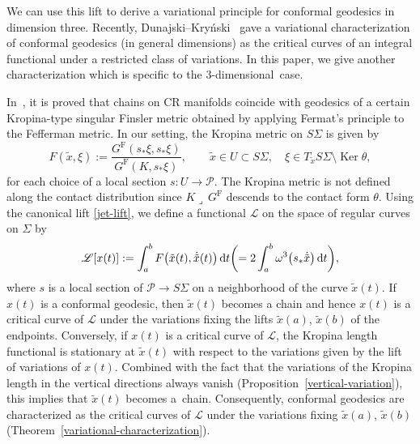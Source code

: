 \documentclass[pdftex]{sigma}
\renewcommand\th{\theta}
\numberwithin{equation}{section}
\begin{document}
We can use this lift to derive a variational principle for conformal geodesics in dimension three. Recently, Dunajski--Kry\'nski~\cite{DK} gave a variational characterization of conformal geodesics (in general dimensions) as the critical curves of an integral functional under a restricted class of variations. In this paper, we give another characterization which is specific to the $3$-dimensional~case.

In~\cite{CMMM}, it is proved that chains on CR manifolds coincide with geodesics of a
certain Kropina-type singular Finsler metric obtained by applying Fermat's principle to the Fefferman metric. In our setting, the Kropina metric on $S\Sigma$ is given by
\[
F(\tilde x, \xi):=\frac{G^{\mathrm{F}}(s_* \xi, s_*\xi)}{G^{\mathrm{F}}(K, s_*\xi)}, \qquad \tilde x\in U\subset S\Sigma,\quad \xi\in T_{\tilde x}S\Sigma\setminus\operatorname{Ker}\th,
\]
for each choice of a local section $s\colon U\to \mathcal{P}$. The Kropina metric is not defined along the contact distribution since $K\lrcorner\, G^{\mathrm{F}}$ descends to the contact form $\th$. Using the canonical lift \eqref{jet-lift}, we define a functional $\mathscr{L}$ on the space of regular curves on $\Sigma$ by
\[
\mathscr{L}[x(t)]:=\int_a^b F\bigl(\tilde x(t), \dot{\tilde x}(t)\bigr)\, {\rm d}t
\biggl(=2\int_a^b \omega^3\bigl(s_*\dot{\tilde x}\bigr)\,{\rm d}t\biggr),
\]
where $s$ is a local section of $\mathcal{P}\to S\Sigma$ on a neighborhood of the curve $\tilde x(t)$.
If $x(t)$ is a conformal geodesic, then $\tilde x(t)$ becomes a chain and hence $x(t)$ is a critical curve of $\mathscr{L}$ under the variations fixing the lifts $\tilde x(a)$, $\tilde x(b)$ of the endpoints.
Conversely, if $x(t)$ is a critical curve of $\mathscr{L}$, the Kropina length functional is stationary at $\tilde x(t)$ with respect to the variations given by the lift of variations of $x(t)$. Combined with the fact that the variations of the Kropina length in the vertical directions always vanish (Proposition~\ref{vertical-variation}), this implies that $\tilde x(t)$ becomes a~chain. Consequently, conformal geodesics are characterized as the critical curves of $\mathscr{L}$ under the variations fixing $\tilde x(a)$, $\tilde x(b)$ (Theorem~\ref{variational-characterization}).
\end{document}
